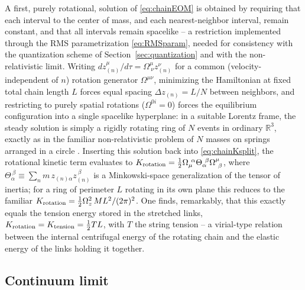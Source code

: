 \documentclass[11pt]{article}
\begin{document}
A first, purely rotational, solution of \eqref{eq:chainEOM} is obtained by
requiring that each interval to the center of mass, and each nearest-neighbor
interval, remain constant, and that all intervals remain spacelike -- a
restriction implemented through the RMS parametrization
\eqref{eq:RMSparam}, needed for consistency with the quantization scheme of
Section~\ref{sec:quantization} and with the non-relativistic limit. Writing
$dz_{(n)}^\mu/d\tau=\Omega^\mu_{\ \nu}z_{(n)}^\nu$ for a common (velocity-independent
of $n$) rotation generator $\Omega^{\mu\nu}$, minimizing the Hamiltonian at
fixed total chain length $L$ forces equal spacing $\Delta z_{(n)}=L/N$ between
neighbors, and restricting to purely spatial rotations ($\Omega^{0i}=0$) forces
the equilibrium configuration into a single spacelike hyperplane: in a suitable
Lorentz frame, the steady solution is simply a rigidly rotating ring of $N$
events in ordinary $\mathbb R^3$, exactly as in the familiar non-relativistic
problem of $N$ masses on springs arranged in a circle
\cite{SuleymanovHorwitzYahalom2017}. Inserting this solution back into
\eqref{eq:chainKsplit}, the rotational kinetic term evaluates to
$K_{\rm rotation}=\tfrac12\Omega_\mu^{\ \alpha}\Theta_\alpha^{\ \beta}\Omega^\mu_{\ \beta}$,
where $\Theta_\alpha^{\ \beta}\equiv\sum_n m\,z_{(n)\alpha}z_{(n)}^{\ \beta}$ is a
Minkowski-space generalization of the tensor of inertia; for a ring of
perimeter $L$ rotating in its own plane this reduces to the familiar
$K_{\rm rotation}=\tfrac12\Omega_z^2\,ML^2/(2\pi)^2$. One finds, remarkably, that
this exactly equals the tension energy stored in the stretched links,
$K_{\rm rotation}=K_{\rm tension}=\tfrac12 TL$, with $T$ the string tension --
a virial-type relation between the internal centrifugal energy of the rotating
chain and the elastic energy of the links holding it together.

\subsection{Continuum limit}
\label{sec:continuum}
\end{document}
